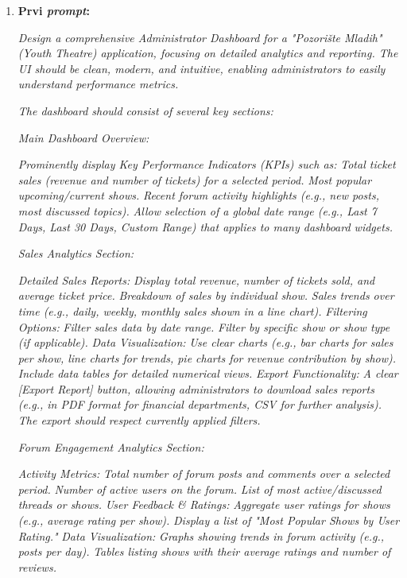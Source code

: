 \begin{enumerate}[itemsep=1ex]
    \item \textbf{Prvi \textit{prompt}:}

    \textit{Design a comprehensive Administrator Dashboard for a "Pozorište Mladih" (Youth Theatre) application, focusing on detailed analytics and reporting. The UI should be clean, modern, and intuitive, enabling administrators to easily understand performance metrics.}

    \textit{The dashboard should consist of several key sections:}

    \textit{Main Dashboard Overview:}

    \textit{Prominently display Key Performance Indicators (KPIs) such as:}
    \textit{Total ticket sales (revenue and number of tickets) for a selected period.}
    \textit{Most popular upcoming/current shows.}
    \textit{Recent forum activity highlights (e.g., new posts, most discussed topics).}
    \textit{Allow selection of a global date range (e.g., Last 7 Days, Last 30 Days, Custom Range) that applies to many dashboard widgets.}
    
    \textit{Sales Analytics Section:}

    \textit{Detailed Sales Reports:}
    \textit{Display total revenue, number of tickets sold, and average ticket price.}
    \textit{Breakdown of sales by individual show.}
    \textit{Sales trends over time (e.g., daily, weekly, monthly sales shown in a line chart).}
    \textit{Filtering Options:}
    \textit{Filter sales data by date range.}
    \textit{Filter by specific show or show type (if applicable).}
    \textit{Data Visualization:}
    \textit{Use clear charts (e.g., bar charts for sales per show, line charts for trends, pie charts for revenue contribution by show).}
    \textit{Include data tables for detailed numerical views.}
    \textit{Export Functionality:}
    \textit{A clear [Export Report] button, allowing administrators to download sales reports (e.g., in PDF format for financial departments, CSV for further analysis). The export should respect currently applied filters.}
    
    \textit{Forum Engagement Analytics Section:}

    \textit{Activity Metrics:}
    \textit{Total number of forum posts and comments over a selected period.}
    \textit{Number of active users on the forum.}
    \textit{List of most active/discussed threads or shows.}
    \textit{User Feedback \& Ratings:}
    \textit{Aggregate user ratings for shows (e.g., average rating per show).}
    \textit{Display a list of "Most Popular Shows by User Rating."}
    \textit{Data Visualization:}
    \textit{Graphs showing trends in forum activity (e.g., posts per day).}
    \textit{Tables listing shows with their average ratings and number of reviews.}
    

\end{enumerate}
